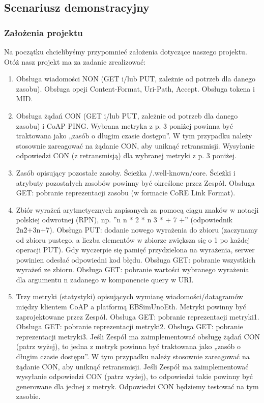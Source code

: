 \subsection{Scenariusz demonstracyjny}

\subsubsection{Założenia projektu}

Na początku chcielibyśmy przypomnieć założenia dotyczące naszego projektu. Otóż nasz projekt ma za zadanie zrealizować:
\begin{enumerate}
    \item Obsługa wiadomości NON (GET i/lub PUT, zależnie od potrzeb dla danego zasobu). Obsługa opcji Content-Format, Uri-Path, Accept. Obsługa tokena i MID.
    \item Obsługa żądań CON (GET i/lub PUT, zależnie od potrzeb dla danego zasobu) i CoAP PING. Wybrana metryka z p. 3 poniżej powinna być traktowana jako „zasób o długim czasie dostępu”. W tym przypadku należy stosownie zareagować na żądanie CON, aby uniknąć retransmisji. Wysyłanie odpowiedzi CON (z retransmisją) dla wybranej metryki z p. 3 poniżej.
    \item Zasób opisujący pozostałe zasoby. Ścieżka /.well-known/core. Ścieżki i atrybuty pozostałych zasobów powinny być określone przez Zespół. Obsługa GET: pobranie reprezentacji zasobu (w formacie CoRE Link Format).
    \item  Zbiór wyrażeń arytmetycznych zapisanych za pomocą ciągu znaków w notacji polskiej odwrotnej (RPN), np. ”n n * 2 * n 3 * + 7 +” (odpowiednik 2n\^2+3n+7). Obsługa PUT: dodanie nowego wyrażenia do zbioru (zaczynamy od zbioru pustego, a liczba elementów w
zbiorze zwiększa się o 1 po każdej operacji PUT). Gdy wyczerpie się pamięć przydzielona na wyrażenia, serwer powinien odesłać odpowiedni kod błędu. Obsługa GET: pobranie wszystkich wyrażeń ze zbioru. Obsługa GET: pobranie wartości wybranego wyrażenia dla argumentu n zadanego w komponencie query w URI.
\item Trzy metryki (statystyki) opisujących wymianę wiadomości/datagramów między klientem CoAP a platformą EBSimUnoEth. Metryki powinny być zaprojektowane przez Zespół. Obsługa GET: pobranie reprezentacji metryki1. Obsługa GET: pobranie reprezentacji metryki2. Obsługa GET: pobranie reprezentacji metryki3. Jeśli Zespół ma zaimplementować obsługę żądań CON (patrz wyżej), to jedna z metryk
powinna być traktowana jako „zasób o długim czasie dostępu”. W tym przypadku należy stosownie zareagować na żądanie CON, aby uniknąć retransmisji. Jeśli Zespół ma zaimplementować wysyłanie odpowiedzi CON (patrz wyżej), to odpowiedzi takie powinny być generowane dla jednej z metryk. Odpowiedzi CON będziemy testować na tym zasobie. 
\end{enumerate}

